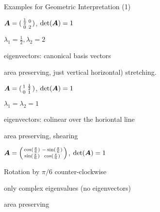 \documentclass[fleqn,aspectratio=169]{beamer}
\begin{document}
\begin{frame}{Examples for Geometric Interpretation (1)}

\plitemsep 0.03in
{
\small
\bce
\item $\bm{A} = 
(\begin{smallmatrix}
\frac{1}{2} & 0 \cr
0 & 2
\end{smallmatrix})$, $\det(\bm{A}) = 1$ 

\bci
\item $\lambda_1 = \frac{1}{2}, \lambda_2 = 2$
\item eigenvectors: canonical basis vectors
\item area preserving, just vertical horizontal) stretching. 
\eci

\item $\bm{A} = 
(\begin{smallmatrix}
1 & \frac{1}{2} \cr
0 & 1
\end{smallmatrix})$, $\det(\bm{A}) = 1$
\bci
\item $\lambda_1 = \lambda_2 = 1$
\item eigenvectors: colinear over the horiontal line
\item area preserving, shearing
\eci

\item $\bm{A} = 
\left(\begin{smallmatrix}
\cos(\frac{\pi}{6}) & -\sin(\frac{\pi}{6}) \cr
\sin(\frac{\pi}{6}) & \cos(\frac{\pi}{6})
\end{smallmatrix} \right)$, $\det(\bm{A}) = 1$
\bci
\item Rotation by $\pi/6$ counter-clockwise
\item only complex eigenvalues (no eigenvectors)
\item area preserving
\eci

\ece
}
{
\vspace{-0.4cm}
\centering
{}

\vspace{0.1cm}


\vspace{0.1cm}

}

\end{frame}
\end{document}
